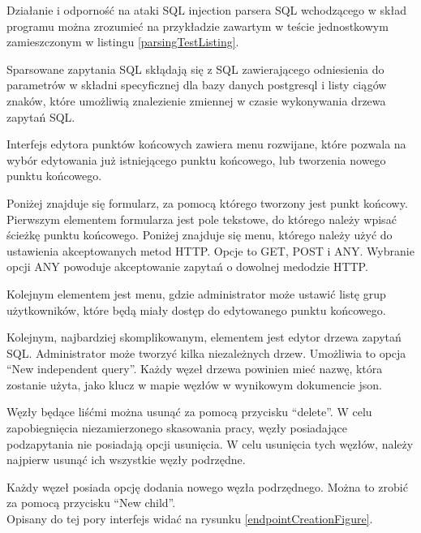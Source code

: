 Działanie i odporność na ataki SQL injection parsera SQL wchodzącego w skład
programu można zrozumieć na przykładzie zawartym w teście jednostkowym
zamieszczonym w listingu \ref{parsingTestListing}.

Sparsowane zapytania SQL skłądają się z SQL zawierającego odniesienia do
parametrów w składni specyficznej dla bazy danych postgresql
\cite{PostgresPrepareStatement} i listy ciągów znaków, które umożliwią
znalezienie zmiennej w czasie wykonywania drzewa zapytań SQL.



Interfejs edytora punktów końcowych zawiera menu rozwijane, które pozwala na
wybór edytowania już istniejącego punktu końcowego, lub tworzenia nowego punktu
końcowego.

Poniżej znajduje się formularz, za pomocą którego tworzony jest punkt końcowy.
Pierwszym elementem formularza jest pole tekstowe, do którego należy wpisać
ścieżkę punktu końcowego. Poniżej znajduje się menu, którego należy użyć do
ustawienia akceptowanych metod HTTP. Opcje to GET, POST i ANY. Wybranie opcji
ANY powoduje akceptowanie zapytań o dowolnej medodzie HTTP.

Kolejnym elementem jest menu, gdzie administrator może ustawić listę grup
użytkowników, które będą miały dostęp do edytowanego punktu końcowego.

Kolejnym, najbardziej skomplikowanym, elementem jest edytor drzewa zapytań SQL.
Administrator może tworzyć kilka niezależnych drzew. Umożliwia to opcja ``New
independent query''. Każdy węzeł drzewa powinien mieć nazwę, która zostanie
użyta, jako klucz w mapie węzłów w wynikowym dokumencie json.

Węzły będące liśćmi można usunąć za pomocą przycisku ``delete''. W celu
zapobiegnięcia niezamierzonego skasowania pracy, węzły posiadające podzapytania
nie posiadają opcji usunięcia. W celu usunięcia tych węzłów, należy najpierw
usunąć ich wszystkie węzły podrzędne.

Każdy węzeł posiada opcję dodania nowego węzła podrzędnego. Można to zrobić za
pomocą przycisku ``New child''.\\

Opisany do tej pory interfejs widać na rysunku \ref{endpointCreationFigure}.\\

